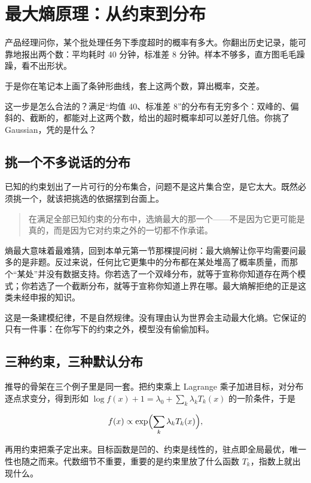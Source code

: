 \section{最大熵原理：从约束到分布}
\label{sec:07-Information-Theory/01-Information-and-Entropy/04}

产品经理问你，某个批处理任务下季度超时的概率有多大。你翻出历史记录，能可靠地报出两个数：平均耗时 40 分钟，标准差 8 分钟。样本不够多，直方图毛毛躁躁，看不出形状。

于是你在笔记本上画了条钟形曲线，套上这两个数，算出概率，交差。

这一步是怎么合法的？满足``均值 40、标准差 8''的分布有无穷多个：双峰的、偏斜的、截断的，都能对上这两个数，给出的超时概率却可以差好几倍。你挑了 Gaussian，凭的是什么？

\subsection{挑一个不多说话的分布}

已知的约束划出了一片可行的分布集合，问题不是这片集合空，是它太大。既然必须挑一个，就该把挑选的依据摆到台面上。

\begin{quote}
在满足全部已知约束的分布中，选熵最大的那一个——不是因为它更可能是真的，而是因为它对约束之外的一切都不作承诺。
\end{quote}

熵最大意味着最难猜，回到本单元第一节那棵提问树：最大熵解让你平均需要问最多的是非题。反过来说，任何比它更集中的分布都在某处堆高了概率质量，而那个``某处''并没有数据支持。你若选了一个双峰分布，就等于宣称你知道存在两个模式；你若选了一个截断分布，就等于宣称你知道上界在哪。最大熵解拒绝的正是这类未经申报的知识。

这是一条建模纪律，不是自然规律。没有理由认为世界会主动最大化熵。它保证的只有一件事：在你写下的约束之外，模型没有偷偷加料。

\subsection{三种约束，三种默认分布}

推导的骨架在三个例子里是同一套。把约束乘上 Lagrange 乘子加进目标，对分布逐点求变分，得到形如 \(\log f(x)+1=\lambda_0+\sum_k\lambda_k T_k(x)\) 的一阶条件，于是

\[
f(x)\propto\exp\Bigl(\sum_k\lambda_k T_k(x)\Bigr),
\]

再用约束把乘子定出来。目标函数是凹的、约束是线性的，驻点即全局最优，唯一性也随之而来。代数细节不重要，重要的是约束里放了什么函数 \(T_k\)，指数上就出现什么。

